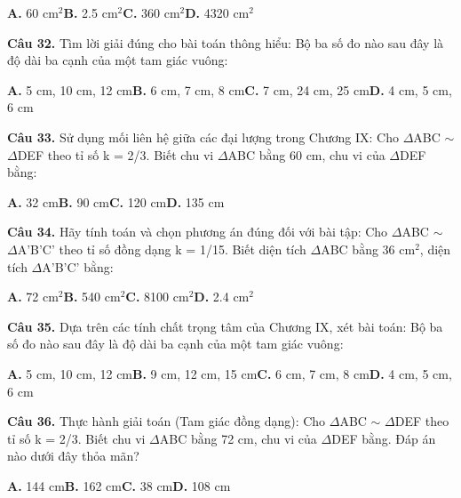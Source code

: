 \documentclass[11pt,a4paper]{article}
\begin{document}
\hspace*{1.5em}\textbf{A.} 60 cm$^2$\quad\quad \textbf{B.} 2.5 cm$^2$\quad\quad \textbf{C.} 360 cm$^2$\quad\quad \textbf{D.} 4320 cm$^2$\par\vspace{2pt}
\textbf{\color{primary} Câu 32.} Tìm lời giải đúng cho bài toán thông hiểu: Bộ ba số đo nào sau đây là độ dài ba cạnh của một tam giác vuông:\par
\hspace*{1.5em}\textbf{A.} 5 cm, 10 cm, 12 cm\quad\quad \textbf{B.} 6 cm, 7 cm, 8 cm\quad\quad \textbf{C.} 7 cm, 24 cm, 25 cm\quad\quad \textbf{D.} 4 cm, 5 cm, 6 cm\par\vspace{2pt}
\textbf{\color{primary} Câu 33.} Sử dụng mối liên hệ giữa các đại lượng trong Chương IX: Cho $\Delta$ABC $\sim$ $\Delta$DEF theo tỉ số k = 2/3. Biết chu vi $\Delta$ABC bằng 60 cm, chu vi của $\Delta$DEF bằng:\par
\hspace*{1.5em}\textbf{A.} 32 cm\quad\quad \textbf{B.} 90 cm\quad\quad \textbf{C.} 120 cm\quad\quad \textbf{D.} 135 cm\par\vspace{2pt}
\textbf{\color{primary} Câu 34.} Hãy tính toán và chọn phương án đúng đối với bài tập: Cho $\Delta$ABC $\sim$ $\Delta$A'B'C' theo tỉ số đồng dạng k = 1/15. Biết diện tích $\Delta$ABC bằng 36 cm$^2$, diện tích $\Delta$A'B'C' bằng:\par
\hspace*{1.5em}\textbf{A.} 72 cm$^2$\quad\quad \textbf{B.} 540 cm$^2$\quad\quad \textbf{C.} 8100 cm$^2$\quad\quad \textbf{D.} 2.4 cm$^2$\par\vspace{2pt}
\textbf{\color{primary} Câu 35.} Dựa trên các tính chất trọng tâm của Chương IX, xét bài toán: Bộ ba số đo nào sau đây là độ dài ba cạnh của một tam giác vuông:\par
\hspace*{1.5em}\textbf{A.} 5 cm, 10 cm, 12 cm\quad\quad \textbf{B.} 9 cm, 12 cm, 15 cm\quad\quad \textbf{C.} 6 cm, 7 cm, 8 cm\quad\quad \textbf{D.} 4 cm, 5 cm, 6 cm\par\vspace{2pt}
\textbf{\color{primary} Câu 36.} Thực hành giải toán (Tam giác đồng dạng): Cho $\Delta$ABC $\sim$ $\Delta$DEF theo tỉ số k = 2/3. Biết chu vi $\Delta$ABC bằng 72 cm, chu vi của $\Delta$DEF bằng. Đáp án nào dưới đây thỏa mãn?\par
\hspace*{1.5em}\textbf{A.} 144 cm\quad\quad \textbf{B.} 162 cm\quad\quad \textbf{C.} 38 cm\quad\quad \textbf{D.} 108 cm\par\vspace{2pt}
\end{document}
